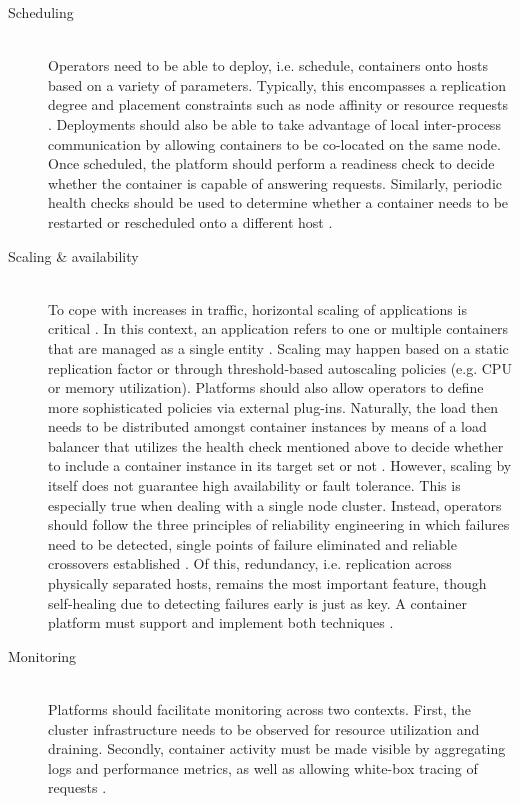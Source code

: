 \begin{description}
  \item[Scheduling]
  \hfill \\
  Operators need to be able to deploy, i.e. schedule, containers onto hosts based on a variety of parameters. Typically, this encompasses a replication degree and placement constraints such as \gls{node affinity} or resource requests \cite[p.~225]{casalicchio2019container}. Deployments should also be able to take advantage of local inter-process communication by allowing containers to be co-located on the same node. Once scheduled, the platform should perform a readiness check to decide whether the container is capable of answering requests. Similarly, periodic health checks should be used to determine whether a container needs to be restarted or rescheduled onto a different host \cite[p.~2]{al2019container}.

  \item[Scaling \& availability]
  \hfill \\
  To cope with increases in traffic, horizontal scaling of applications is critical \cite[p.~1]{al2019container}. In this context, an application refers to one or multiple containers that are managed as a single entity \cite[p.~44]{khan2017key} \cite[p.~2]{pahl2017cloud}. Scaling may happen based on a static replication factor or through threshold-based autoscaling policies (e.g. \acs{CPU} or memory utilization). Platforms should also allow operators to define more sophisticated policies via external plug-ins. Naturally, the load then needs to be distributed amongst container instances by means of a load balancer that utilizes the health check mentioned above to decide whether to include a container instance in its target set or not \cite[pp.~225--226]{casalicchio2019container} \cite[p.~2]{al2019container}. However, scaling by itself does not guarantee high availability or fault tolerance. This is especially true when dealing with a single node cluster. Instead, operators should follow the three principles of reliability engineering in which failures need to be detected, single points of failure eliminated and reliable crossovers established \cite[p.~45]{khan2017key}. Of this, redundancy, i.e. replication across physically separated hosts, remains the most important feature, though self-healing due to detecting failures early is just as key. A container platform must support and implement both techniques \cite[p.~176]{vayghan2019microservice} \cite[p.~53]{burns2016borg}.

  \item[Monitoring]
  \hfill \\
  Platforms should facilitate monitoring across two contexts. First, the cluster infrastructure needs to be observed for resource utilization and draining. Secondly, container activity must be made visible by aggregating logs and performance metrics, as well as allowing \gls{white-box tracing} of requests \cite[p.~47]{khan2017key}.
\end{description}

